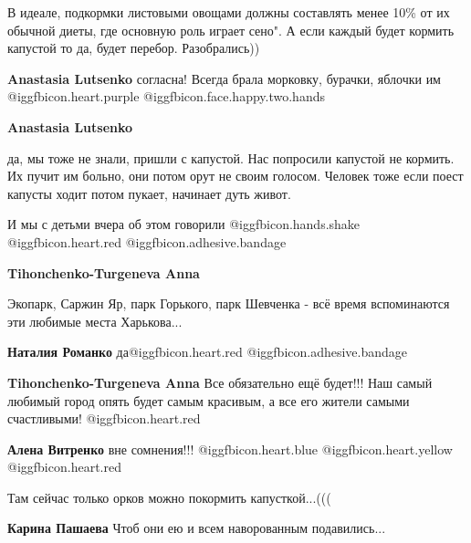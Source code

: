 \begin{itemize}
\begin{itemize}
В идеале, подкормки листовыми овощами должны составлять менее 10\% от их обычной
диеты, где основную роль играет сено". А если каждый будет кормить капустой то
да, будет перебор. Разобрались))

\textbf{Anastasia Lutsenko} согласна! Всегда брала морковку, бурачки, яблочки им @igg{fbicon.heart.purple}  @igg{fbicon.face.happy.two.hands} 

\textbf{Anastasia Lutsenko} 

да, мы тоже не знали, пришли с капустой. Нас попросили капустой не кормить. Их
пучит им больно, они потом орут не своим голосом. Человек тоже если поест
капусты ходит потом пукает, начинает дуть живот.

\end{itemize} %

И мы с детьми вчера об этом говорили @igg{fbicon.hands.shake} @igg{fbicon.heart.red} @igg{fbicon.adhesive.bandage} 

\begin{itemize} %
\textbf{Tihonchenko-Turgeneva Anna} 

Экопарк, Саржин Яр, парк Горького, парк Шевченка - всё время вспоминаются эти
любимые места Харькова...

\textbf{Наталия Романко} да@igg{fbicon.heart.red} @igg{fbicon.adhesive.bandage} 

\textbf{Tihonchenko-Turgeneva Anna} Все обязательно ещё будет!!! Наш самый любимый город опять будет самым красивым, а все его жители самыми счастливыми! @igg{fbicon.heart.red}

\textbf{Алена Витренко} вне сомнения!!! @igg{fbicon.heart.blue}  @igg{fbicon.heart.yellow} @igg{fbicon.heart.red}
\end{itemize} %

Там сейчас только орков можно покормить капусткой...(((

\textbf{Карина Пашаева} Чтоб они ею и всем наворованным подавились...

\end{itemize} %

